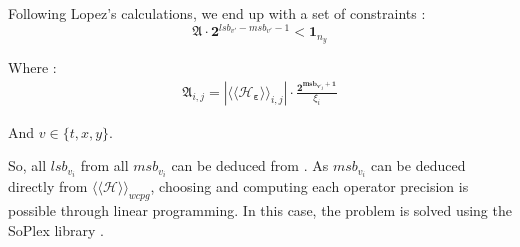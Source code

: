 %
%
%
%
		Following Lopez's calculations, we end up with a set of constraints :
		\begin{equation} \label{constraint}
			\boldsymbol{\mathfrak{A}} \cdot \boldsymbol{2}^{lsb_{v'}-msb_{v'}-1} < \boldsymbol{1}_{n_y}
		\end{equation}

		Where :
		\begin{eqnarray}
			\boldsymbol{\mathfrak{A}}_{i,j}= | \langle\langle \mathcal{H}_{\boldsymbol{\varepsilon}} \rangle\rangle_{i,j} | \cdot \frac{\boldsymbol{2^{msb_{v'_j}+1}}}{\xi_i} %
		\end{eqnarray}

		And $v\in\{t,x,y\}$.

		 So, all $lsb_{v_i}$ from all $msb_{v_i}$ can  be deduced from \label{constraint}.
		As $msb_{v_i}$ can be deduced directly from $\langle\langle \mathcal{H} \rangle\rangle_{wcpg}$, choosing and computing each operator precision is possible through linear programming.
		In this case, the problem is solved using the SoPlex library \cite{soplex}.


		
